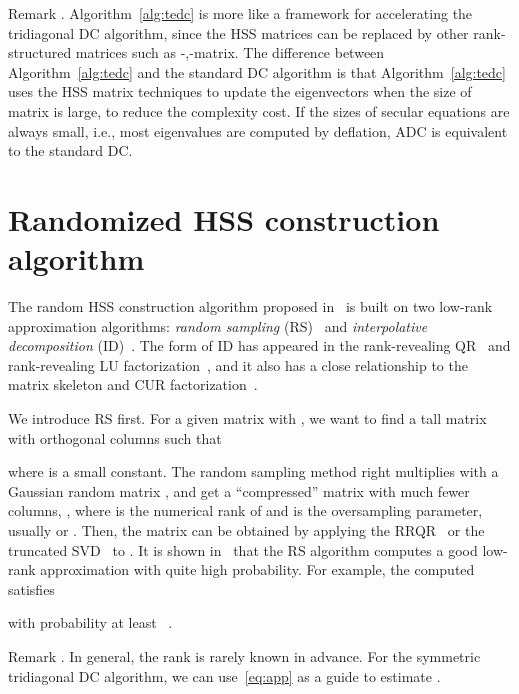 \documentclass[times]{nlaauth}
\newcounter{algorithm}
\newcounter{remark}
\newenvironment{remark}{\refstepcounter{remark}\vspace{1ex}
{\sc Remark \theremark.}\hspace{0.3em}\parindent=0pt}{\vspace{1ex}}
\begin{document}
\begin{remark}
Algorithm~\ref{alg:tedc} is more like a framework for accelerating the tridiagonal DC algorithm,
since the HSS matrices can be replaced by other rank-structured matrices such as -,-matrix.
The difference between Algorithm~\ref{alg:tedc} and the standard DC algorithm is that
Algorithm~\ref{alg:tedc} uses the HSS matrix techniques to update the eigenvectors when
the size of matrix  is large, to reduce the complexity cost.
If the sizes of secular equations are always small, i.e., most eigenvalues are computed by deflation, ADC is equivalent to the standard DC.
\end{remark}


\section{Randomized HSS construction algorithm}

The random HSS construction algorithm proposed in~\cite{rand-hss} is built on two low-rank approximation algorithms:
\emph{random sampling} (RS)~\cite{Martinsson-Rev10,Martinsson-PNAS07}
and \emph{interpolative decomposition} (ID)~\cite{Cheng-Random,Martinsson-Harmon}.
The form of ID has appeared in the rank-revealing QR~\cite{Gu-RRQR} and rank-revealing LU factorization~\cite{Pan00}, and
it also has a close relationship to the matrix skeleton and CUR factorization~\cite{GTZ-ACA,Stewart-QR}.

We introduce RS first. For a given  matrix  with , we want to find a tall matrix
 with orthogonal columns such that

where  is a small constant.
The random sampling method right multiplies  with a Gaussian random matrix ,
and get a ``compressed'' matrix  with much fewer columns, ,
where  is the numerical rank of  and  is the oversampling parameter, usually  or .
Then, the matrix  can be obtained by applying the RRQR~\cite{Chan92,Gu-RRQR} or the truncated SVD~\cite{Golub-book2} to .
It is shown in~\cite{rand-hss,Martinsson-Rev10} that the RS algorithm computes a good low-rank
approximation with quite high probability. For example, the computed  satisfies

with probability at least ~\cite{rand-hss}.

\begin{remark}
In general, the rank  is rarely known in advance. For the symmetric tridiagonal DC algorithm, we can
use~\eqref{eq:app} as a guide to estimate .
\end{remark}
\end{document}
